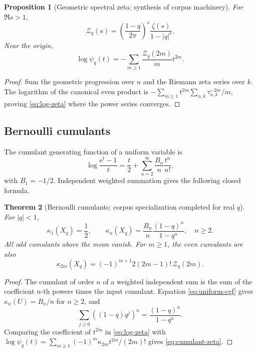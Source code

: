 \documentclass[11pt,oneside]{article}
\newtheorem{theorem}{Theorem}[section]
\newtheorem{proposition}[theorem]{Proposition}
\theoremstyle{definition}
\theoremstyle{remark}
\newcommand{\e}{\mathrm e}
\begin{document}
\begin{proposition}[Geometric spectral zeta; synthesis of corpus machinery]
For \(\Re s>1\),
\begin{equation}\label{eq:spectral-zeta}
 \mathcal Z_q(s)=
 \left(\frac{1-q}{2\pi}\right)^s\frac{\zeta(s)}{1-|q|^s}.
\end{equation}
Near the origin,
\begin{equation}\label{eq:log-zeta}
 \log\psi_q(t)=-\sum_{m\ge1}\frac{\mathcal Z_q(2m)}m t^{2m}.
\end{equation}
\end{proposition}

\begin{proof}
Sum the geometric progression over \(n\) and the Riemann zeta series over
\(k\).  The logarithm of the canonical even product is
\(-\sum_{m\ge1}t^{2m}\sum_{n,k}\tau_{n,k}^{-2m}/m\), proving
\eqref{eq:log-zeta} where the power series converges.
\end{proof}

\subsection{Bernoulli cumulants}
The cumulant generating function of a uniform variable is
\begin{equation}\label{eq:uniform-cgf}
 \log\frac{\e^t-1}{t}
 =\frac t2+\sum_{n=2}^{\infty}\frac{B_n}{n}\frac{t^n}{n!},
\end{equation}
with \(B_1=-1/2\).  Independent weighted summation gives the following closed
formula.

\begin{theorem}[Bernoulli cumulants; corpus specialization completed for real
\(q\)]\label{thm:cumulants}
For \(|q|<1\),
\begin{equation}\label{eq:cumulants}
 \kappa_1(X_q)=\frac12,
 \qquad
 \kappa_n(X_q)=\frac{B_n}{n}\frac{(1-q)^n}{1-q^n},\quad n\ge2.
\end{equation}
All odd cumulants above the mean vanish.  For \(m\ge1\), the even cumulants are
also
\begin{equation}\label{eq:cumulant-zeta}
 \kappa_{2m}(X_q)
 =(-1)^{m+1}2(2m-1)!\,\mathcal Z_q(2m).
\end{equation}
\end{theorem}

\begin{proof}
The cumulant of order \(n\) of a weighted independent sum is the sum of the
coefficient \(n\)-th powers times the input cumulant.  Equation
\eqref{eq:uniform-cgf} gives \(\kappa_n(U)=B_n/n\) for \(n\ge2\), and
\[
 \sum_{j\ge0}((1-q)q^j)^n=\frac{(1-q)^n}{1-q^n}.
\]
Comparing the coefficient of \(t^{2m}\) in \eqref{eq:log-zeta} with
\(\log\psi_q(t)=\sum_{m\ge1}(-1)^m\kappa_{2m}t^{2m}/(2m)!\) gives
\eqref{eq:cumulant-zeta}.
\end{proof}
\end{document}
